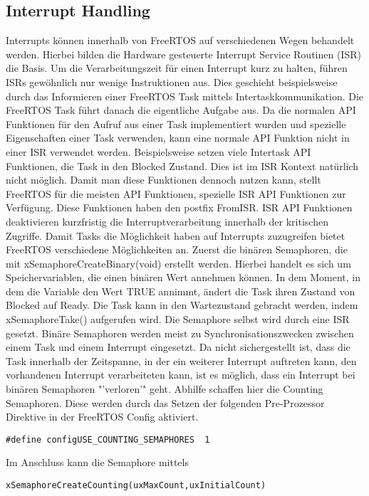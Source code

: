 \subsection{Interrupt Handling}
\label{sec:Interrupt}
Interrupts können innerhalb von FreeRTOS auf verschiedenen Wegen behandelt werden. Hierbei bilden die Hardware gesteuerte Interrupt Service Routinen (ISR) die Basis. Um die Verarbeitungszeit für einen Interrupt kurz zu halten, führen ISRs gewöhnlich nur wenige Instruktionen aus. Dies geschieht beispielsweise durch das Informieren einer FreeRTOS Task mittels Intertaskkommunikation. Die FreeRTOS Task führt danach die eigentliche Aufgabe aus. Da die normalen API Funktionen für den Aufruf aus einer Task implementiert wurden und spezielle Eigenschaften einer Task verwenden, kann eine normale API Funktion nicht in einer ISR verwendet werden. Beispielsweise setzen viele Intertask API Funktionen, die Task in den Blocked Zustand. Dies ist im ISR Kontext natürlich nicht möglich. Damit man diese Funktionen dennoch nutzen kann, stellt FreeRTOS für die meisten API Funktionen, spezielle ISR API Funktionen zur Verfügung. Diese Funktionen haben den postfix FromISR. ISR API Funktionen deaktivieren kurzfristig die Interruptverarbeitung innerhalb der kritischen Zugriffe.
Damit Tasks die Mög\-lich\-keit haben auf Interrupts zuzugreifen bietet FreeRTOS verschiedene Mög\-lich\-keit\-en an. Zuerst die binären Semaphoren, die mit xSemaphoreCreateBinary(void) erstellt werden. Hierbei handelt es sich um Speichervariablen, die einen binären Wert annehmen können. In dem Moment, in dem die Variable den Wert TRUE annimmt, ändert die Task ihren Zustand von Blocked auf Ready. Die Task kann in den Wartezustand gebracht werden, indem xSemaphoreTake() aufgerufen wird. Die Semaphore selbst wird durch eine ISR gesetzt. Binäre Semaphoren werden meist zu Synchronisationszwecken zwischen einem Task und einem Interrupt eingesetzt.
Da nicht sichergestellt ist, dass die Task innerhalb der Zeitspanne, in der ein weiterer Interrupt auftreten kann, den vorhandenen Interrupt verarbeiteten kann, ist es möglich, dass ein Interrupt bei binären Semaphoren "'verloren'" geht. Abhilfe schaffen hier die Counting Semaphoren. Diese werden durch das Setzen der folgenden Pre-Prozessor Direktive in der FreeRTOS Config aktiviert.
\begin{lstlisting}[numbers = none]
#define configUSE_COUNTING_SEMAPHORES  1
\end{lstlisting}
Im Anschluss kann die Semaphore mittels
\begin{lstlisting}[numbers = none]
xSemaphoreCreateCounting(uxMaxCount,uxInitialCount) 
\end{lstlisting}
